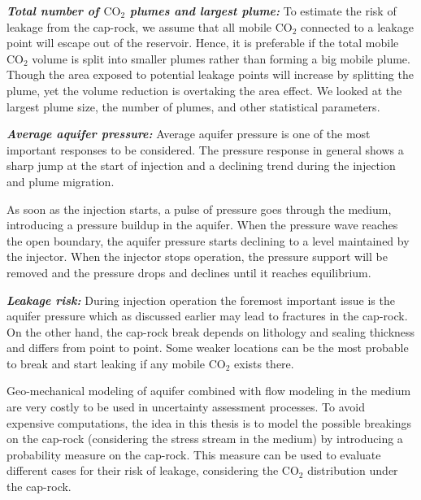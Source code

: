 \textbf{\textit{Total number of $\mbox{CO}_2$ plumes and largest plume:}} To
estimate the risk of leakage from the cap-rock, we assume that all mobile
CO$_2$ connected to a leakage point will escape out of the reservoir. Hence, it
is preferable if the total mobile CO$_2$ volume is split into smaller plumes
rather than forming a big mobile plume. Though the area exposed to potential
leakage points will increase by splitting the plume, yet the volume reduction is
overtaking the area effect. We looked at the largest plume size, the number of
plumes, and other statistical parameters. 

% 

\textbf{\textit{Average aquifer pressure:}} Average aquifer pressure is one of
the most important responses to be
considered. The pressure response in general shows a sharp jump at the start of
injection and a declining trend during the injection and plume migration.  

As soon as the injection starts, a pulse of pressure goes through the
medium, introducing
a pressure buildup in the aquifer. When the pressure wave reaches the open
boundary, the aquifer pressure starts declining to a level maintained by the
injector. When the injector stops operation, the pressure support will be
removed and the pressure drops and declines until it reaches equilibrium.

\textbf{\textit{Leakage risk:}} During injection operation the foremost
important issue is the aquifer pressure
which as discussed earlier may lead to fractures in the cap-rock. On the other
hand, the cap-rock break depends on lithology and sealing thickness and differs
from point to point. Some weaker locations can be the most probable to
break and start leaking if any mobile CO$_2$ exists there.

Geo-mechanical modeling of aquifer combined with flow modeling in the medium are
very costly to be used in uncertainty assessment processes. To avoid expensive
computations, the idea in this thesis is to model the possible
breakings on the cap-rock (considering the stress stream in the medium) by
introducing a probability measure on the cap-rock. This measure can be used to
evaluate different cases for their risk of leakage, considering the CO$_2$
distribution under the cap-rock. 

